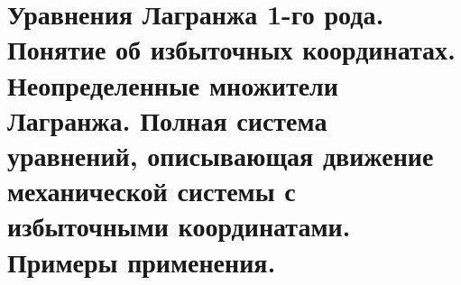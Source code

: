 \chapter{Уравнения Лагранжа 1-го рода. Понятие об избыточных координатах.
Неопределенные множители Лагранжа. Полная система уравнений, описывающая
движение механической системы с избыточными координатами. Примеры применения.}

\newpage

